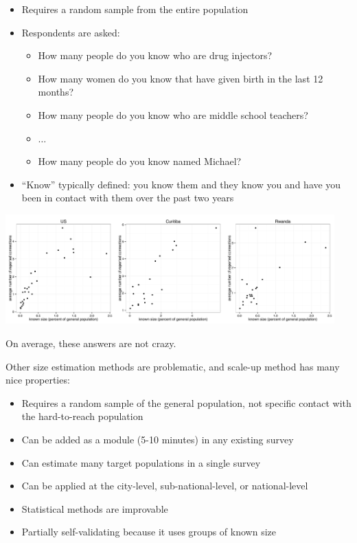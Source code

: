 \documentclass[aspectratio=169]{beamer}
\begin{document}
\begin{frame}

\begin{itemize}
\item Requires a random sample from the entire population 
\item Respondents are asked:
\begin{itemize}
\item How many people do you know who are drug injectors? 
\item How many women do you know that have given birth in the last 12 months?
\item How many people do you know who are middle school teachers?
\item $\ldots$
\item How many people do you know named Michael?
\end{itemize}
\item ``Know'' typically defined: you know them and they know you and have you been in contact with them over the past two years
\end{itemize}

\end{frame}
\begin{frame}

\begin{center}
\includegraphics[width=0.95\textwidth]{figures/three_studies_truesize_known}
\end{center}
\vfill
On average, these answers are not crazy.

\end{frame}
\begin{frame}

Other size estimation methods are problematic, and scale-up method has many nice properties:
\begin{itemize}
\item Requires a random sample of the general population, not specific contact with the hard-to-reach population 
\item Can be added as a module (5-10 minutes) in any existing survey 
\item Can estimate many target populations in a single survey 
\item Can be applied at the city-level, sub-national-level, or national-level
\item Statistical methods are improvable 
\item Partially self-validating because it uses groups of known size
\end{itemize}


\end{frame}
\end{document}
